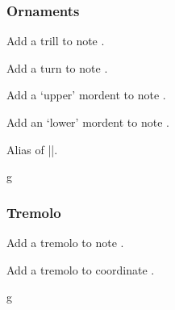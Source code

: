 \subsubsection{Ornaments}\label{sec:music-notes:misc:ornaments}
\begin{command}{\tmtrill{}}
  Add a trill to note .
\end{command}
\begin{command}{\tmturn{}}
  Add a turn to note .
\end{command}
\begin{command}{\tmuppermordent{}}
  Add a `upper' mordent to note .
\end{command}
\begin{command}{\tmlowermordent{}}
  Add an `lower' mordent to note .
\end{command}
\begin{command}{\tmmordent{}}
  Alias of |\tmuppermordent|.
\end{command}
\begin{codeexample}[]
\begin{tmline}
\begin{tmstaff}{g}{}
\end{tmstaff}
\end{tmline}
\end{codeexample}
\subsubsection{Tremolo}\label{sec:music-notes:misc:tremolo}
\begin{command}{\tmtremolo{}}
  Add a tremolo to note .
\end{command}
\begin{command}{\tmtremolocoordinate{}}
  Add a tremolo to coordinate .
\end{command}
\begin{codeexample}[]
\begin{tmline}
\begin{tmstaff}{g}{}
\end{tmstaff}
\end{tmline}
\end{codeexample}
